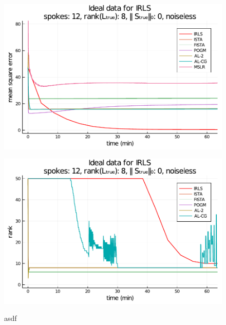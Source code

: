 \begin{figure}
    \centering
    \begin{minipage}{0.48\linewidth}
        \centering
        \includegraphics[width=\linewidth]{images/ideal_MSE.pdf}
        \label{fig:ideal_MSE}
    \end{minipage}
    \begin{minipage}{0.48\linewidth}
        \centering
        \includegraphics[width=\linewidth]{images/ideal_rank.pdf}
        \label{fig:ideal_rank}
    \end{minipage}
    \caption{asdf}
    \label{fig:ideal_recon}
\end{figure}


